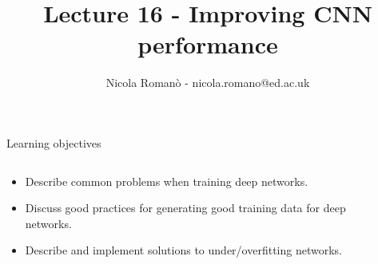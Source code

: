 \documentclass[9pt, aspectratio=169]{beamer}
\author{Nicola Roman\`o - nicola.romano@ed.ac.uk}
\title{Lecture 16 - Improving CNN performance}
\date{}
\begin{document}

\begin{frame}
    \titlepage
\end{frame}

\begin{frame}
    {Learning objectives}
    \begin{columns}
        \begin{column}{0.8\textwidth}
            \begin{itemize}
                \item Describe common problems when training deep networks.
                \item Discuss good practices for generating good training data for deep networks.
                \item Describe and implement solutions to under/overfitting networks.
            \end{itemize}
        \end{column}
        \begin{column}{0.2\textwidth}

\end{column}
\end{columns}
\end{frame}
\end{document}
